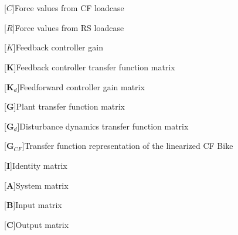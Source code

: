 \section*{}
\begin{acronym}[LONGEST]
	[\ensuremath{C}]{\acrounit{\N}Force values from CF loadcase}
\end{acronym}
\begin{acronym}[LONGEST]
	[\ensuremath{R}]{\acrounit{\N}Force values from RS loadcase}
\end{acronym}
\begin{acronym}[LONGEST]
	[\ensuremath{K}]{\acrounit{-}Feedback controller gain}
\end{acronym}
\begin{acronym}[LONGEST]
	[\ensuremath{\mathbf{K}}]{\acrounit{-}Feedback controller transfer function matrix}
\end{acronym}
\begin{acronym}[LONGEST]
	[\ensuremath{\mathbf{K}_d}]{\acrounit{-}Feedforward controller gain matrix}
\end{acronym}
\begin{acronym}[LONGEST]
	[\ensuremath{\mathbf{G}}]{\acrounit{-}Plant transfer function matrix}
\end{acronym}
\begin{acronym}[LONGEST]
	[\ensuremath{\mathbf{G}_d}]{\acrounit{-}Disturbance dynamics transfer function matrix}
\end{acronym}
\begin{acronym}[LONGEST]
	[\ensuremath{\mathbf{G}_{CF}}]{\acrounit{-}Transfer function representation of the linearized CF Bike}
\end{acronym}
\begin{acronym}[LONGEST]
	[\ensuremath{\mathbf{I}}]{\acrounit{-}Identity matrix}
\end{acronym}
\begin{acronym}[LONGEST]
	[\ensuremath{\mathbf{A}}]{\acrounit{-}System matrix}
\end{acronym}
\begin{acronym}[LONGEST]
	[\ensuremath{\mathbf{B}}]{\acrounit{-}Input matrix}
\end{acronym}
\begin{acronym}[LONGEST]
	[\ensuremath{\mathbf{C}}]{\acrounit{-}Output matrix}
\end{acronym}

